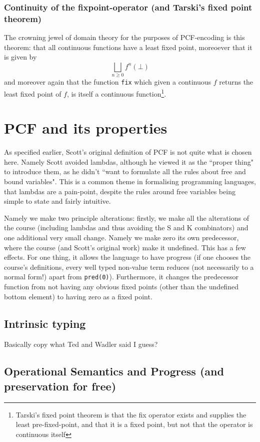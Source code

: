 \documentclass[12pt,a4paper,twoside,openright]{report}
\begin{document}
\subsubsection{Continuity of the fixpoint-operator (and Tarski's fixed point theorem)}
The crowning jewel of domain theory for the purposes of PCF-encoding is this theorem: that all continuous functions have a least fixed point, moreoever that it is given by
\[
\bigsqcup_{n \geq 0} f^n(\bot)
\]
and moreover again that the function \texttt{fix} which given a continuous $f$ returns the least fixed point of $f$, is itself a continuous function\footnote{Tarski's fixed point theorem is that the fix operator exists and supplies the least pre-fixed-point, and that it is a fixed point, but not that the operator is continuous itself}.
\section{PCF and its properties}
As specified earlier, Scott's original definition of PCF is not quite what is chosen here. Namely Scott avoided lambdas, although he viewed it as the ``proper thing" to introduce them, as he didn't ``want to formulate all the rules about free and bound variables". This is a common theme in formalising programming languages, that lambdas are a pain-point, despite the rules around free variables being simple to state and fairly intuitive. 

Namely we make two principle alterations: firstly, we make all the alterations of the course (including lambdas and thus avoiding the S and K combinators) and one additional very small change. Namely we make zero its own predecessor, where the course (and Scott's original work) make it undefined. This has a few effects. For one thing, it allows the language to have progress (if one chooses the course's definitions, every well typed non-value term reduces (not necessarily to a normal form!) apart from \texttt{pred(0)}). Furthermore, it changes the predecessor function from not having any obvious fixed points (other than the undefined bottom element) to having zero as a fixed point.
\subsection{Intrinsic typing} 
Basically copy what Ted and Wadler said I guess?
\subsection{Operational Semantics and Progress (and preservation for free)}
\end{document}
